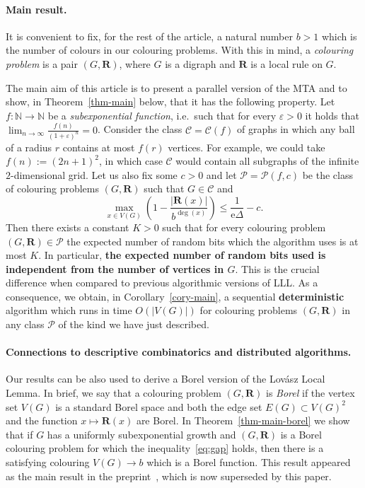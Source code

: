 \documentclass[12pt,a4paper]{article}
\numberwithin{equation}{section}
\theoremstyle{definition}
\newcommand{\eps}{{\varepsilon}}
\newcommand{\De}{{\Delta}}
\renewcommand{\le}{\leqslant}
\newcommand\NN{\mathbb N}
\renewcommand{\cal}[1]{{\mathcal #1}}
\newcommand{\me}{\mathrm{e}}
\begin{document}
    \paragraph{Main result.} It is convenient to fix, for the rest of the article, a natural number $b>1$ which is the number of colours in our colouring problems. With this in mind, a \emph{colouring problem} is a pair $(G,\mathbf R)$, where $G$ is a digraph and $\mathbf R$ is a local rule on $G$. 
    
    The main aim of this article is to present a parallel version of the MTA and to show, in Theorem~\ref{thm-main} below, that it has the following property. Let $f\colon \NN\to \NN$ be a \emph{subexponential function}, i.e.~such that for every $\eps>0$ it holds that $\lim_{n\to\infty} \frac{f(n)}{(1+\eps)^n} =0$. Consider the class $\cal C=\cal C(f)$ of graphs in which any ball of a radius $r$ contains at most $f(r)$ vertices. For example, we could take $f(n):=(2n+1)^2$, in which case $\cal C$ would contain all subgraphs of the infinite $2$-dimensional grid. Let us also fix some $c>0$ and let $\cal P=\cal P(f,c)$ be the class of colouring problems $(G,\mathbf R)$ such that $G\in \cal C$ and 
    \begin{equation}\label{eq:gap}
    \max_{x\in V(G)} \left(1 - \frac{|\mathbf R(x)|}{b^{\deg(x)}} \right)\le \frac{1}{\me\De} - c.
    \end{equation} 
    Then there exists a constant $K>0$ such that for every colouring problem $(G,\mathbf R)\in \cal P$ the expected number of random bits which the algorithm uses is at most $K$. In particular, \textbf{the expected number of random bits used is independent from the number of vertices in $G$}. This is the crucial difference when compared to previous algorithmic versions of LLL. As a consequence, we obtain, in Corollary~\ref{cory-main}, a sequential \textbf{deterministic} algorithm which runs in time $O(|V(G)|)$ for colouring problems $(G,\mathbf R)$ in any class $\cal P$ of the kind we have just described.
    
    \paragraph{Connections to descriptive combinatorics and distributed algorithms.}
    Our results can be also used to derive a Borel version of the Lov\'asz Local Lemma. In brief, we say that a colouring problem $(G,\mathbf R)$ is \emph{Borel} if the vertex set $V(G)$ is a standard Borel space and both the edge set $E(G)\subset V(G)^2$ and the function $x\mapsto\mathbf R(x)$ are Borel. 
    In Theorem~\ref{thm-main-borel} we show that if $G$ has a uniformly subexponential growth and $(G,\mathbf R)$ is a Borel colouring problem for which the inequality~\eqref{eq:gap} holds, then there is a satisfying colouring $V(G)\to b$ which is a Borel function. This result appeared as the main result in the preprint~\cite[Theorem~4.7]{CsokaGrabowskiMathePikhurkoTyros:arxiv}, which is now superseded by this paper.
    
\end{document}
